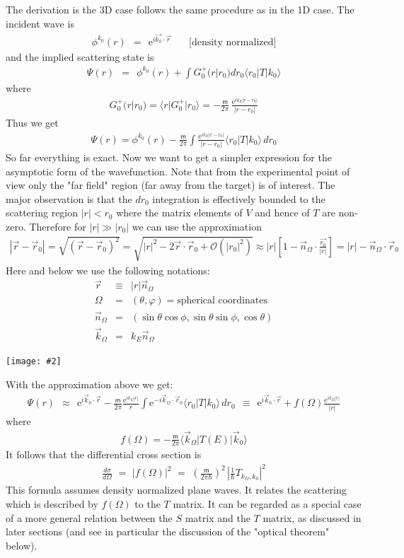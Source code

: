 \documentclass[onecolumn,fleqn]{revtex4}
\newcommand{\eexp}{\mathrm{e}^}
\newcommand{\mass}{\mathsf{m}}
\newcommand{\putgraph}[2][0.30\hsize]{\texttt{[image: \#2]}}
\newcommand{\beq}{\begin{eqnarray}}
\newcommand{\eeq}{\end{eqnarray}}
\begin{document}
The derivation is the 3D case follows the same procedure as in the 1D case.
The incident wave is 
\beq
\phi^{k_0}(r) \ \ = \ \ \eexp{ i \vec {k_0} \cdot \vec{r} }
\ \ \ \ \ \ \ \ \mbox{[density normalized]}
\eeq
and the implied scattering state is  
\beq
\Psi(r) \ \ =  \ \ \phi^{k_0}(r)+ \int G_0^{+}(r|r_0) dr_0  \langle r_0 | T | k_0 \rangle 
\eeq
where
\beq
G_0^{+}(r|r_0) = \langle r|G_0^{+}|r_0\rangle = 
-\frac{\mass}{2\pi}\,\frac{\eexp{ik_E|r-r_0|}}{|r-r_0|}
\eeq
Thus we get
\beq
\Psi(r)=\phi^{k_0}(r)
-  \frac{\mass}{2\pi} \int 
\frac{\eexp{ik_E |r-r_0|}}{|r-r_0|} 
\langle r_0|T|k_0 \rangle \, dr_0 
\eeq
So far everything is exact.
Now we want to get a simpler expression for 
the asymptotic form of the wavefunction. 
Note that from the experimental point of view 
only the "far field" region (far away from the target) 
is of interest. 
The major observation is that the $dr_0$ integration 
is effectively bounded to the scattering region $|r|<r_0$ 
where the matrix elements of $V$ and hence of $T$ are 
non-zero. Therefore for $|r|\gg |r_0|$ we can use the approximation
\beq
|\vec{r}-\vec{r}_0| = \sqrt{(\vec{r}-\vec{r}_0)^2} 
= \sqrt{|r|^2 - 2\vec{r} \cdot \vec{r}_0 + \mathcal{O}(|r_0|^2)} 
\approx |r| \left[ 1 - \vec{n}_{\Omega} \cdot \frac{\vec{r_0}}{|r|} \right]
= |r| - \vec{n}_{\Omega} \cdot \vec{r}_0
\eeq
Here and below we use the following notations:
\beq
\vec{r}  &\equiv&  |r| \vec{n}_{\Omega}
\\ \nonumber
\Omega &=& (\theta, \varphi) = \mbox{spherical coordinates}
\\ \nonumber
\vec{n}_{\Omega} &=& (\sin\theta\cos\phi, \sin\theta\sin\phi, \cos\theta)
\\ \nonumber
\vec{k}_{\Omega} &=& k_E \vec{n}_{\Omega}
\eeq


\begin{center}
\putgraph[0.6\hsize]{SphericalCoordinates}
\end{center}

With the approximation above we get:
\beq
\Psi(r) \ \ \approx \ \  
\eexp{i \vec{k}_0\cdot\vec r}
-\frac{\mass}{2\pi}
\frac{ \eexp{i k_E |r|} }{r}
\int \eexp{-i\vec{k}_{\Omega} \cdot \vec{r}_0} 
\langle r_0|T|k_0\rangle \, dr_0
\ \ \equiv \ \ 
\eexp{i \vec{k}_0\cdot \vec{r}}
+ f(\Omega)\frac{ \eexp{i k_E |r|} }{|r|}
\eeq
where
\beq
f(\Omega) = -\frac{\mass}{2\pi} 
\langle \vec{k}_{\Omega} | T(E)| \vec{k}_0 \rangle
\eeq
It follows that the differential cross section is 
\beq
\frac {d\sigma}{d\Omega}\,\,=\,\, 
|f(\Omega)|^2 \,\,=\,\, 
\left(\frac{\mass}{2\pi\hbar}\right)^2
\, \left| \frac{1}{\hbar} T_{k_{\Omega},k_0}\right|^2
\eeq
This formula assumes density normalized plane waves.
It relates the scattering which is described by $f(\Omega)$ 
to the $T$ matrix. It can be regarded as a special case 
of a more general relation between the $S$ matrix 
and the $T$ matrix, as discussed in later sections 
(and see in particular the discussion of the "optical theorem" below). 
   
\end{document}
